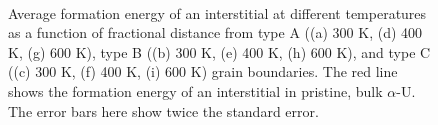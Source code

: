 \documentclass[review]{elsarticle}
\begin{document}
\begin{figure}[h!]
\\
\caption{Average formation energy of an interstitial at different temperatures as a function of fractional distance from type A ((a) 300 K, (d) 400 K, (g) 600 K), type B ((b) 300 K, (e) 400 K, (h) 600 K), and type C ((c) 300 K, (f) 400 K, (i) 600 K) grain boundaries. The red line shows the formation energy of an interstitial in pristine, bulk $\alpha$-U. The error bars here show twice the standard error.}
\label{fig:Seg_inter}
\end{figure}
\newpage
\end{document}
